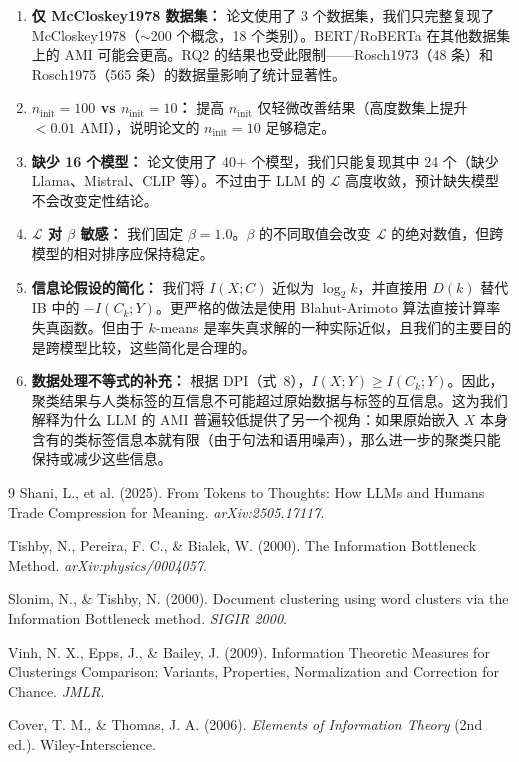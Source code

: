 \documentclass[11pt,a4paper]{article}
\begin{document}
\begin{enumerate}[noitemsep]
\item \textbf{仅 McCloskey1978 数据集：} 论文使用了 3 个数据集，我们只完整复现了 McCloskey1978（$\sim$200 个概念，18 个类别）。BERT/RoBERTa 在其他数据集上的 AMI 可能会更高。RQ2 的结果也受此限制——Rosch1973（48 条）和 Rosch1975（565 条）的数据量影响了统计显著性。
  \item \textbf{$n_{\text{init}}=100$ vs $n_{\text{init}}=10$：} 提高 $n_{\text{init}}$ 仅轻微改善结果（高度数集上提升 $<0.01$ AMI），说明论文的 $n_{\text{init}}=10$ 足够稳定。
  \item \textbf{缺少 16 个模型：} 论文使用了 40+ 个模型，我们只能复现其中 24 个（缺少 Llama、Mistral、CLIP 等）。不过由于 LLM 的 $\mathcal{L}$ 高度收敛，预计缺失模型不会改变定性结论。
  \item \textbf{$\mathcal{L}$ 对 $\beta$ 敏感：} 我们固定 $\beta=1.0$。$\beta$ 的不同取值会改变 $\mathcal{L}$ 的绝对数值，但跨模型的相对排序应保持稳定。
  \item \textbf{信息论假设的简化：} 我们将 $I(X;C)$ 近似为 $\log_2 k$，并直接用 $D(k)$ 替代 IB 中的 $-I(C_k;Y)$。更严格的做法是使用 Blahut-Arimoto 算法直接计算率失真函数。但由于 $k$-means 是率失真求解的一种实际近似，且我们的主要目的是跨模型比较，这些简化是合理的。
  \item \textbf{数据处理不等式的补充：} 根据 DPI（式~8），$I(X;Y) \geq I(C_k;Y)$。因此，聚类结果与人类标签的互信息不可能超过原始数据与标签的互信息。这为我们解释为什么 LLM 的 AMI 普遍较低提供了另一个视角：如果原始嵌入 $X$ 本身含有的类标签信息本就有限（由于句法和语用噪声），那么进一步的聚类只能保持或减少这些信息。
\end{enumerate}

\begin{thebibliography}{9}
 Shani, L., et al. (2025). From Tokens to Thoughts: How LLMs and Humans Trade Compression for Meaning. \textit{arXiv:2505.17117}.

 Tishby, N., Pereira, F. C., \& Bialek, W. (2000). The Information Bottleneck Method. \textit{arXiv:physics/0004057}.

 Slonim, N., \& Tishby, N. (2000). Document clustering using word clusters via the Information Bottleneck method. \textit{SIGIR 2000}.

 Vinh, N. X., Epps, J., \& Bailey, J. (2009). Information Theoretic Measures for Clusterings Comparison: Variants, Properties, Normalization and Correction for Chance. \textit{JMLR}.

 Cover, T. M., \& Thomas, J. A. (2006). \textit{Elements of Information Theory} (2nd ed.). Wiley-Interscience.
\end{thebibliography}
\end{document}
